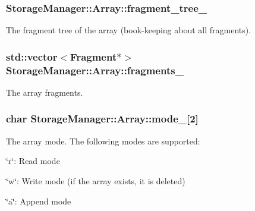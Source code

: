 \subsubsection[{fragment\+\_\+tree\+\_\+}]{ Storage\+Manager\+::\+Array\+::fragment\+\_\+tree\+\_\+\hspace{0.3cm}{\ttfamily [private]}}\label{classStorageManager_1_1Array_a6b69e56370842f04f1c077e142f4f0b5}
The fragment tree of the array (book-\/keeping about all fragments). \hypertarget{classStorageManager_1_1Array_ab5e894d3193e5e2fd08c0d183fc4ad9f}{}
\subsubsection[{fragments\+\_\+}]{\setlength{\rightskip}{0pt plus 5cm}std\+::vector$<${\bf Fragment}$\ast$$>$ Storage\+Manager\+::\+Array\+::fragments\+\_\+\hspace{0.3cm}{\ttfamily [private]}}\label{classStorageManager_1_1Array_ab5e894d3193e5e2fd08c0d183fc4ad9f}
The array fragments. \hypertarget{classStorageManager_1_1Array_a57ab3dcdbc1bc536390fc64a35dccf00}{}
\subsubsection[{mode\+\_\+}]{\setlength{\rightskip}{0pt plus 5cm}char Storage\+Manager\+::\+Array\+::mode\+\_\+\mbox{[}2\mbox{]}\hspace{0.3cm}{\ttfamily [private]}}\label{classStorageManager_1_1Array_a57ab3dcdbc1bc536390fc64a35dccf00}
The array mode. The following modes are supported\+:

\char`\"{}r\char`\"{}\+: Read mode

\char`\"{}w\char`\"{}\+: Write mode (if the array exists, it is deleted)

\char`\"{}a\char`\"{}\+: Append mode \hypertarget{classStorageManager_1_1Array_a4f3b670bdd10b8e72bc560d1357622ab}{}
